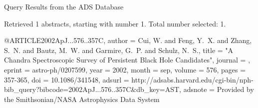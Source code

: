 Query Results from the ADS Database


Retrieved 1 abstracts, starting with number 1.  Total number selected: 1.

@ARTICLE{2002ApJ...576..357C,
   author = {{Cui}, W. and {Feng}, Y.~X. and {Zhang}, S.~N. and {Bautz}, M.~W. and 
	{Garmire}, G.~P. and {Schulz}, N.~S.},
    title = "{A Chandra Spectroscopic Survey of Persistent Black Hole Candidates}",
  journal = {\apj},
   eprint = {astro-ph/0207599},
     year = 2002,
    month = sep,
   volume = 576,
    pages = {357-365},
      doi = {10.1086/341548},
   adsurl = {http://adsabs.harvard.edu/cgi-bin/nph-bib_query?bibcode=2002ApJ...576..357C&db_key=AST},
  adsnote = {Provided by the Smithsonian/NASA Astrophysics Data System}
}


